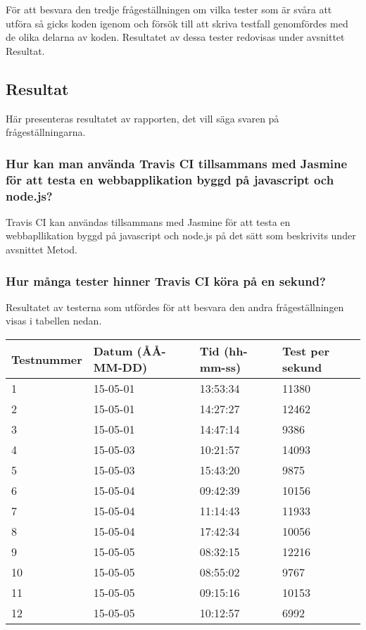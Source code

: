 För att besvara den tredje frågeställningen om vilka tester som är svåra att
utföra så gicks koden igenom och försök till att skriva testfall genomfördes
med de olika delarna av koden. Resultatet av dessa tester redovisas under 
avsnittet Resultat.

\subsection{Resultat}
Här presenteras resultatet av rapporten, det vill säga svaren på
frågeställningarna.

\subsubsection{Hur kan man använda Travis CI tillsammans med Jasmine 
för att testa en webbapplikation byggd på javascript och node.js?}
Travis CI kan användas tillsammans med Jasmine för att testa en
webbapllikation byggd på javascript och node.js på det sätt som beskrivits
under avsnittet Metod.

\subsubsection{Hur många tester hinner Travis CI köra på en sekund?}
Resultatet av testerna som utfördes för att besvara den andra frågeställningen
visas i tabellen nedan.

\begin{center}
  \begin{tabular}{| l | l | l | l |}
  \hline
  Testnummer & Datum (ÅÅ-MM-DD) & Tid (hh-mm-ss) & Test per sekund\\ \hline
  1 & 15-05-01 & 13:53:34 & 11380\\ \hline
  2 & 15-05-01 & 14:27:27 & 12462\\ \hline
  3 & 15-05-01 & 14:47:14 & 9386\\ \hline 
  4 & 15-05-03 & 10:21:57 & 14093\\ \hline 
  5 & 15-05-03 & 15:43:20 & 9875\\ \hline 
  6 & 15-05-04 & 09:42:39 & 10156\\ \hline 
  7 & 15-05-04 & 11:14:43 & 11933\\ \hline 
  8 & 15-05-04 & 17:42:34 & 10056\\ \hline 
  9 & 15-05-05 & 08:32:15 & 12216\\ \hline 
  10 & 15-05-05 & 08:55:02 & 9767\\ \hline 
  11 & 15-05-05 & 09:15:16 & 10153\\ \hline 
  12 & 15-05-05 & 10:12:57 & 6992\\ \hline 
  \end{tabular}
\end{center}

